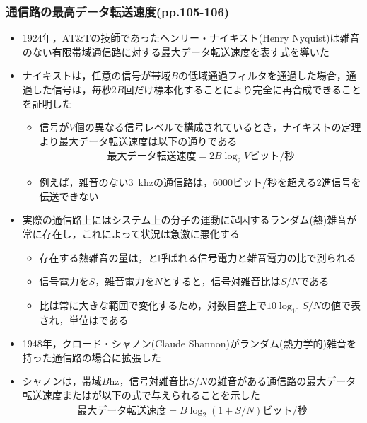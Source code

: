 \documentclass[a4paper]{ltjsarticle}
\begin{document}
    \subsubsection{通信路の最高データ転送速度(pp.105-106)}
      \begin{itemize}
        \item 1924年，AT\&Tの技師であったヘンリー・ナイキスト(Henry Nyquist)は雑音のない有限帯域通信路に対する最大データ転送速度を表す式を導いた
        \item ナイキストは，任意の信号が帯域$B$の低域通過フィルタを通過した場合，通過した信号は，毎秒$2B$回だけ標本化することにより完全に再合成できることを証明した
        \begin{itemize}
          \item 信号が$V$個の異なる信号レベルで構成されているとき，ナイキストの定理より最大データ転送速度は以下の通りである
            \begin{align}
              \text{最大データ転送速度} = 2B \log_2 V \text{ビット/秒}
            \end{align}
          \item 例えば，雑音のない\SI{3}{khz}の通信路は，6000ビット/秒を超える2進信号を伝送できない
        \end{itemize}
        \item 実際の通信路上にはシステム上の分子の運動に起因するランダム(熱)雑音が常に存在し，これによって状況は急激に悪化する
        \begin{itemize}
          \item 存在する熱雑音の量は，と呼ばれる信号電力と雑音電力の比で測られる
          \item 信号電力を$S$，雑音電力を$N$とすると，信号対雑音比は$S/N$である
          \item 比は常に大きな範囲で変化するため，対数目盛上で$10 \log_{10} S/N$の値で表され，単位はである
				\end{itemize}
        \item 1948年，クロード・シャノン(Claude Shannon)がランダム(熱力学的)雑音を持った通信路の場合に拡張した				
        \item シャノンは，帯域$B$\si{hz}，信号対雑音比$S/N$の雑音がある通信路の最大データ転送速度またはが以下の式で与えられることを示した
          \begin{align}
            \text{最大データ転送速度} = B \log_2 (1+S/N) \text{ビット/秒}
          \end{align}
      \end{itemize}
\end{document}
